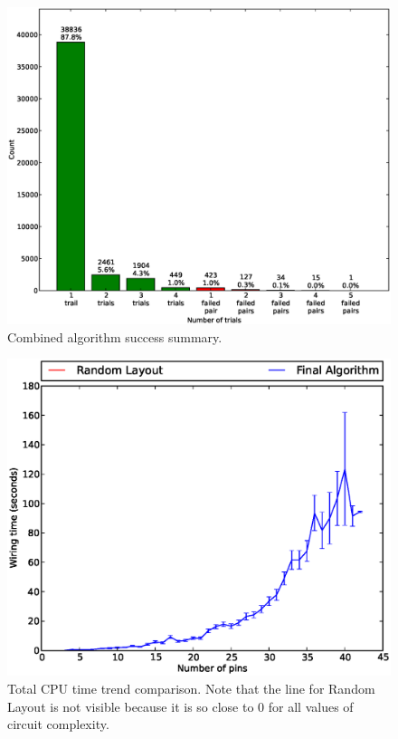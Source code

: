 \begin{figure}
\begin{center}
\includegraphics[width=\textwidth]{Images/final_algorithm_num_trials.eps}
\caption[Combined algorithm success summary]{Combined algorithm success summary.}
\label{fig:final_num_trials}
\end{center}
\end{figure}

\begin{figure}
\begin{center}
\includegraphics[width=\textwidth]{Images/final_algorithm_time_trend.eps}
\caption[Combined algorithm time trend]{Total CPU time trend comparison.
Note that the line for Random Layout is
not visible because it is so close to $0$ for all values of circuit complexity.}
\label{fig:final_time_trend}
\end{center}
\end{figure}

